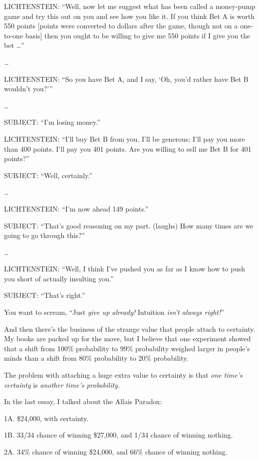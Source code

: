 {
 LICHTENSTEIN: ``Well, now let me suggest what has
been called a money-pump game and try this out on you and see how you
like it. If you think Bet A is worth 550 points [points were converted
to dollars after the game, though not on a one-to-one basis] then you
ought to be willing to give me 550 points if I give you the bet
\ldots''}

{
 \textit{\ldots}}

{
 LICHTENSTEIN: ``So you have Bet A, and I say,
`Oh, you'd rather have Bet B
wouldn't you?'''}

{
 \ldots}

{
 SUBJECT: ``I'm losing
money.''}

{
 LICHTENSTEIN: ``I'll buy Bet B
from you. I'll be generous; I'll pay
you more than 400 points. I'll pay you 401 points. Are
you willing to sell me Bet B for 401 points?''}

{
 SUBJECT: ``Well, certainly.''}

{
 \ldots}

{
 LICHTENSTEIN: ``I'm now ahead 149
points.''}

{
 SUBJECT: ``That's good reasoning
on my part. (laughs) How many times are we going to go through
this?''}

{
 \ldots}

{
 LICHTENSTEIN: ``Well, I think
I've pushed you as far as I know how to push you short
of actually insulting you.''}

{
 SUBJECT: ``That's
right.''}

{
 You want to scream, ``Just \textit{give up
already!} Intuition \textit{isn't always
right!}''}

{
 And then there's the business of the strange value
that people attach to certainty. My books are packed up for the move,
but I believe that one experiment showed that a shift from 100\%
probability to 99\% probability weighed larger in
people's minds than a shift from 80\% probability to
20\% probability.}

{
 The problem with attaching a huge extra value to certainty is that
\textit{one time's certainty} is \textit{another
time's probability.}}

{
 In the last essay, I talked about the Allais Paradox:}

{
 1A. \$24,000, with certainty.}

{
 1B. 33/34 chance of winning \$27,000, and 1/34 chance of winning
nothing.}

{
 2A. 34\% chance of winning \$24,000, and 66\% chance of winning
nothing.}

